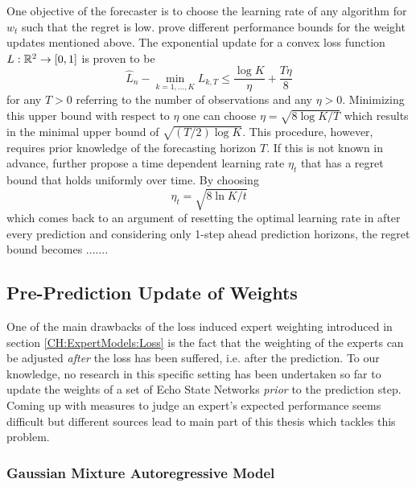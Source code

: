 One objective of the forecaster is to choose the learning rate of any algorithm for $w_t$ such that the regret is low. \cite{CesaBianchi2006PredictionLearningGames} prove different performance bounds for the weight updates mentioned above. The exponential update for a convex loss function $L: \mathbb{R}^2 \to [0,1]$ is proven to be
\begin{equation}
    \hat L_n - \min_{k=1,...,K} L_{k,T} \leq \frac{\log{K}}{\eta} + \frac{T\eta}{8} \label{EQ:OptimalLearningRate}
\end{equation}
for any $T > 0$ referring to the number of observations and any $\eta > 0$. Minimizing this upper bound with respect to $\eta$ one can choose $\eta = \sqrt{8\log{K}/T}$ which results in the minimal upper bound of $\sqrt{(T/2)\log{K}}$. This procedure, however, requires prior knowledge of the forecasting horizon $T$. If this is not known in advance, \cite{CesaBianchi2006PredictionLearningGames} further propose a time dependent learning rate $\eta_t$ that has a regret bound that holds uniformly over time. By choosing
\begin{equation}
    \eta_t = \sqrt{8\ln{K}/t}
\end{equation}
which comes back to an argument of resetting the optimal learning rate in  after every prediction and considering only 1-step ahead prediction horizons, the regret bound becomes ....... %


\subsection{Pre-Prediction Update of Weights}

One of the main drawbacks of the loss induced expert weighting introduced in section \ref{CH:ExpertModels:Loss} is the fact that the weighting of the experts can be adjusted \textit{after} the loss has been suffered, i.e. after the prediction. To our knowledge, no research in this specific setting has been undertaken so far to update the weights of a set of Echo State Networks \textit{prior} to the prediction step. Coming up with measures to judge an expert's expected performance seems difficult but different sources lead to main part of this thesis which tackles this problem.

\subsubsection{Gaussian Mixture Autoregressive Model}
\label{CH:ExpertModels:GMM}

